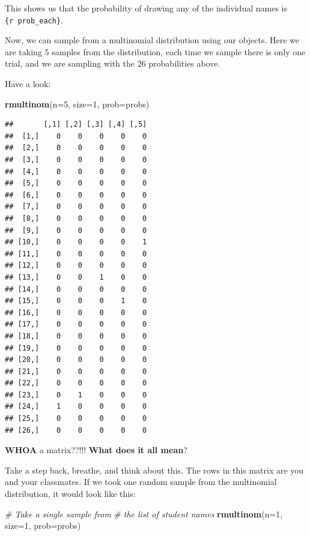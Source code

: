 \documentclass[
]{book}
\newenvironment{Shaded}{\begin{snugshade}}{\end{snugshade}}
\newcommand{\CommentTok}[1]{\textcolor[rgb]{0.56,0.35,0.01}{\textit{#1}}}
\newcommand{\DataTypeTok}[1]{\textcolor[rgb]{0.13,0.29,0.53}{#1}}
\newcommand{\DecValTok}[1]{\textcolor[rgb]{0.00,0.00,0.81}{#1}}
\newcommand{\KeywordTok}[1]{\textcolor[rgb]{0.13,0.29,0.53}{\textbf{#1}}}
\newcommand{\NormalTok}[1]{#1}
\begin{document}
This shows us that the probability of drawing any of the individual names is \texttt{\{r\ prob\_each\}}.

Now, we can sample from a multinomial distribution using our objects. Here we are taking 5 samples from the distribution, each time we sample there is only one trial, and we are sampling with the 26 probabilities above.

Have a look:

\begin{Shaded}
\begin{Highlighting}[]
\KeywordTok{rmultinom}\NormalTok{(}\DataTypeTok{n=}\DecValTok{5}\NormalTok{, }\DataTypeTok{size=}\DecValTok{1}\NormalTok{, }\DataTypeTok{prob=}\NormalTok{probs)}
\end{Highlighting}
\end{Shaded}

\begin{verbatim}
##       [,1] [,2] [,3] [,4] [,5]
##  [1,]    0    0    0    0    0
##  [2,]    0    0    0    0    0
##  [3,]    0    0    0    0    0
##  [4,]    0    0    0    0    0
##  [5,]    0    0    0    0    0
##  [6,]    0    0    0    0    0
##  [7,]    0    0    0    0    0
##  [8,]    0    0    0    0    0
##  [9,]    0    0    0    0    0
## [10,]    0    0    0    0    1
## [11,]    0    0    0    0    0
## [12,]    0    0    0    0    0
## [13,]    0    0    1    0    0
## [14,]    0    0    0    0    0
## [15,]    0    0    0    1    0
## [16,]    0    0    0    0    0
## [17,]    0    0    0    0    0
## [18,]    0    0    0    0    0
## [19,]    0    0    0    0    0
## [20,]    0    0    0    0    0
## [21,]    0    0    0    0    0
## [22,]    0    0    0    0    0
## [23,]    0    1    0    0    0
## [24,]    1    0    0    0    0
## [25,]    0    0    0    0    0
## [26,]    0    0    0    0    0
\end{verbatim}

\textbf{WHOA} a matrix??!!! \textbf{What does it all mean}?

Take a step back, breathe, and think about this. The rows in this matrix are you and your classmates. If we took one random sample from the multinomial distribution, it would look like this:

\begin{Shaded}
\begin{Highlighting}[]
\CommentTok{# Take a single sample from}
\CommentTok{# the list of student names    }
\KeywordTok{rmultinom}\NormalTok{(}\DataTypeTok{n=}\DecValTok{1}\NormalTok{, }\DataTypeTok{size=}\DecValTok{1}\NormalTok{, }\DataTypeTok{prob=}\NormalTok{probs)}
\end{Highlighting}
\end{Shaded}
\end{document}
